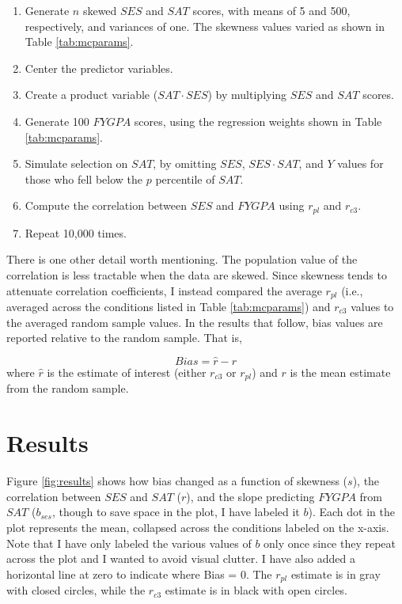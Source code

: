 \documentclass[english,man]{apa6}
\providecommand{\tightlist}{%
  \setlength{\itemsep}{0pt}\setlength{\parskip}{0pt}}
\theoremstyle{definition}
\theoremstyle{definition}
\theoremstyle{remark}
\begin{document}
\begin{enumerate}
\def\labelenumi{(\arabic{enumi})}
\tightlist
\item
  Generate \(n\) skewed \(SES\) and \(SAT\) scores, with means of 5 and
  500, respectively, and variances of one. The skewness values varied as
  shown in Table \ref{tab:mcparams}.
\item
  Center the predictor variables.
\item
  Create a product variable (\(SAT\cdot SES\)) by multiplying \(SES\)
  and \(SAT\) scores.
\item
  Generate 100 \(FYGPA\) scores, using the regression weights shown in
  Table \ref{tab:mcparams}.
\item
  Simulate selection on \(SAT\), by omitting \(SES\), \(SES\cdot SAT\),
  and \(Y\) values for those who fell below the \(p\) percentile of
  \(SAT\).
\item
  Compute the correlation between \(SES\) and \(FYGPA\) using \(r_{pl}\)
  and \(r_{c3}\).
\item
  Repeat 10,000 times.
\end{enumerate}

There is one other detail worth mentioning. The population value of the
correlation is less tractable when the data are skewed. Since skewness
tends to attenuate correlation coefficients, I instead compared the
average \(r_{pl}\) (i.e., averaged across the conditions listed in Table
\ref{tab:mcparams}) and \(r_{c3}\) values to the averaged random sample
values. In the results that follow, bias values are reported relative to
the random sample. That is,

\[Bias = \hat{r}-r\] \noindent where \(\hat{r}\) is the estimate of
interest (either \(r_{c3}\) or \(r_{pl}\)) and \(r\) is the mean
estimate from the random sample.

\section{Results}\label{results}

Figure \ref{fig:results} shows how bias changed as a function of
skewness (\(s\)), the correlation between \(SES\) and \(SAT\) (\(r\)),
and the slope predicting \(FYGPA\) from \(SAT\) (\(b_{ses}\), though to
save space in the plot, I have labeled it \(b\)). Each dot in the plot
represents the mean, collapsed across the conditions labeled on the
x-axis. Note that I have only labeled the various values of \(b\) only
once since they repeat across the plot and I wanted to avoid visual
clutter. I have also added a horizontal line at zero to indicate where
Bias = 0. The \(r_{pl}\) estimate is in gray with closed circles, while
the \(r_{c3}\) estimate is in black with open circles.
\end{document}
